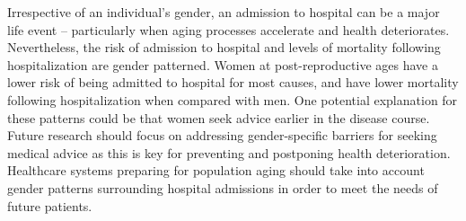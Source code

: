 Irrespective of an individual's gender, an admission to hospital 
can be a major life event -- particularly when aging processes 
accelerate and health deteriorates. Nevertheless, the risk of admission 
to hospital and levels of mortality following hospitalization are 
gender patterned. Women at post-reproductive ages have a lower risk 
of being admitted to hospital for most causes, and have lower mortality 
following hospitalization when compared with men. One potential 
explanation for these patterns could be that women seek advice 
earlier in the disease course. Future research should focus on addressing 
gender-specific barriers for seeking medical advice as this is key for preventing 
and postponing health deterioration. Healthcare systems preparing 
for population aging should take into account gender patterns 
surrounding hospital admissions in order to meet the needs of 
future patients.







